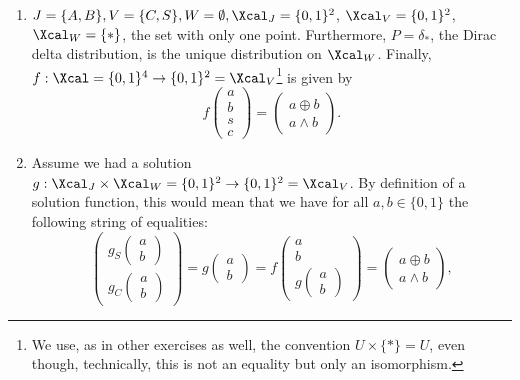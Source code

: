\begin{enumerate}
\begin{gradedsolution}
\begin{enumerate}
  \item $J=\{A, B\}, V = \{C, S\}, W = \emptyset, \Xcal_J = \{0, 1\}^{2}$, $\Xcal_V = \{0,1\}^{2}$, $\Xcal_W = \{*\}$, the set with only one point. Furthermore, $P = \delta_*$, the Dirac delta distribution, is the unique distribution on $\Xcal_W$. Finally, $f: \Xcal = \{0,1\}^{4} \to \{0,1\}^{2} = \Xcal_V$\footnote{We use, as in other exercises as well, the convention $U \times \{*\} = U$, even though, technically, this is not an equality but only an isomorphism.} is given by
  \begin{equation}
    f \begin{pmatrix} a \\ b \\ s \\ c \end{pmatrix} = \begin{pmatrix} a \oplus b \\ a \wedge b\end{pmatrix}.
    \label{eq:causal_mechanism_half_adder}
  \end{equation}
  \item Assume we had a solution $g: \Xcal_J\times \Xcal_W = \{0,1\}^2 \to \{0,1\}^2 = \Xcal_V$.
  By definition of a solution function, this would mean that we have for all $a, b \in \{0,1\}$ the following string of equalities:
  \begin{equation}
    \begin{pmatrix} g_S \begin{pmatrix} a \\ b\end{pmatrix} \\ g_C \begin{pmatrix} a \\ b \end{pmatrix}\end{pmatrix}
    = g \begin{pmatrix} a \\ b\end{pmatrix} 
    = f \begin{pmatrix} a \\ b \\ g \begin{pmatrix} a \\ b\end{pmatrix}\end{pmatrix}
    = \begin{pmatrix} a \oplus b \\ a \wedge b\end{pmatrix},

\end{equation}
\end{enumerate}
\end{gradedsolution}
\end{enumerate}
